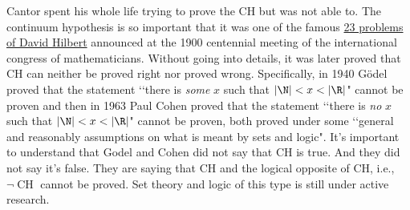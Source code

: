 Cantor spent his whole life trying to prove the CH but was not able to.
The continuum hypothesis is so important that it was
one of the famous
\href{https://en.wikipedia.org/wiki/Hilbert%27s_problems}{23 problems of David Hilbert}
announced at the
1900 centennial meeting of the international congress of mathematicians.
Without going into details, it was later proved that
CH can neither be proved right nor proved wrong.
Specifically, in 1940 G\"odel proved that the statement
\lq\lq there is \textit{some} $x$ such that $|\N| < x < |\R|$"
cannot be proven
and then in 1963 Paul Cohen proved that the statement
\lq\lq there is \textit{no} $x$ such that $|\N| < x < |\R|$"
cannot be proven, both
proved under some \lq\lq general and reasonably assumptions
on what is meant by sets and logic".
It's important to understand that
Godel and Cohen did not say that CH is true.
And they did not say it's false.
They are saying that CH 
and the logical opposite of CH, i.e., $\lnot\operatorname{CH}$ cannot be proved.
Set theory and logic of this type is still under active research.

